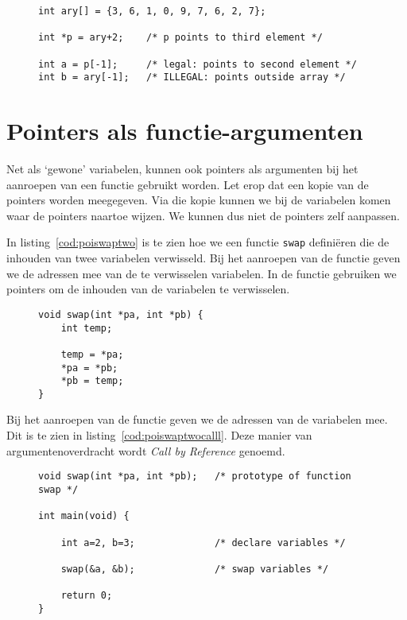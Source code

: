 \begin{figure}[!ht]
\begin{lstlisting}[caption=Pointer die naar een element in een array wijst.,label=cod:poipointstonegeindex]
int ary[] = {3, 6, 1, 0, 9, 7, 6, 2, 7};

int *p = ary+2;    /* p points to third element */

int a = p[-1];     /* legal: points to second element */
int b = ary[-1];   /* ILLEGAL: points outside array */
\end{lstlisting}
\end{figure}


\section{Pointers als functie-argumenten}
\label{sec:pointersalsfunctieargumenten}
Net als `gewone' variabelen, kunnen ook pointers als argumenten bij het aanroepen van een functie gebruikt worden. Let erop dat een kopie van de pointers worden meegegeven. Via die kopie kunnen we bij de variabelen komen waar de pointers naartoe wijzen. We kunnen dus niet de pointers zelf aanpassen.

In listing~\ref{cod:poiswaptwo} is te zien hoe we een functie \texttt{swap} definiëren die de inhouden van twee variabelen verwisseld. Bij het aanroepen van de functie geven we de adressen mee van de te verwisselen variabelen. In de functie gebruiken we pointers om de inhouden van de variabelen te verwisselen.

\begin{figure}[!ht]
\begin{lstlisting}[caption=Het verwisselen van twee variabelen met behulp van pointers.,label=cod:poiswaptwo]
void swap(int *pa, int *pb) {
	int temp;

    temp = *pa;
    *pa = *pb;
    *pb = temp;
}
\end{lstlisting}
\end{figure}

Bij het aanroepen van de functie geven we de adressen van de variabelen mee. Dit is te zien in listing~\ref{cod:poiswaptwocalll}. Deze manier van argumentenoverdracht wordt \textsl{Call by Reference} genoemd.

\begin{figure}[!ht]
\begin{lstlisting}[caption=Aanroep van de functie.,label=cod:poiswaptwocalll]
void swap(int *pa, int *pb);   /* prototype of function swap */

int main(void) {

    int a=2, b=3;              /* declare variables */

    swap(&a, &b);              /* swap variables */

    return 0;
}
\end{lstlisting}
\end{figure}

